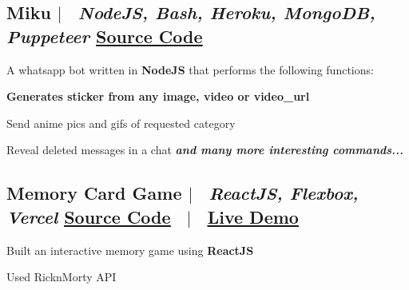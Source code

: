 \documentclass[12pt]{article}
\begin{document}
\subsection*{
  Miku 
  $|$
  \normalsize \normalfont \ \textit{NodeJS, Bash, Heroku, MongoDB, Puppeteer}
  \hfill 
  \normalsize \underline{\href{https://github.com/HARSH-SHETH/miku}{Source Code}}
}
  A whatsapp bot written in \textbf{NodeJS} that performs the following functions: 
  \begin{description}
    \setlength{\itemsep}{0em}
    \setlength{\itemindent}{2\parindent}
    \item[$\bullet$]{ \textbf{Generates sticker from any image, video or video\_url }}
    \item[$\bullet$]{ Send anime pics and gifs of requested category}
    \item[$\bullet$]{ Reveal deleted messages in a chat}
    \emph{\textbf{and many more interesting commands...}}
  \end{description}

\subsection*{
  Memory Card Game 
  $|$ 
  \normalsize \normalfont \ \textit{ReactJS, Flexbox, Vercel }
  \hfill
  \normalsize \underline{\href{https://github.com/memory_card_game}{Source Code}}
  \ $|$ \ 
  \normalsize \underline{\href{https://harsh-sheth.github.io/memory_card_game}{Live Demo}}
}
  \begin{description}
    \setlength{\itemsep}{0em}
    \setlength{\itemindent}{2\parindent}
    \item[$\bullet$]{Built an interactive memory game using \textbf{ReactJS}}
    \item[$\bullet$]{Used RicknMorty API}
  \end{description}
\end{document}
